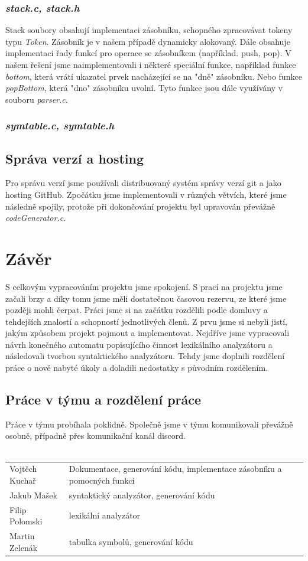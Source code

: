 \documentclass{article}
\begin{document}
\subsubsection{\emph{stack.c, stack.h}}
Stack soubory obsahují implementaci zásobníku, schopného zpracovávat tokeny typu \emph{Token}. Zásobník je v našem případě dynamicky alokovaný. Dále obsahuje implementaci řady funkcí pro operace se zásobníkem (například. push, pop). V našem řešení jsme naimplementovali i některé speciální funkce, například funkce \emph{bottom}, která vrátí ukazatel prvek nacházející se na "dně" zásobníku. Nebo funkce \emph{popBottom}, která "dno" zásobníku uvolní. Tyto funkce jsou dále využívány v souboru \emph{parser.c}.

\subsubsection{\emph{symtable.c, symtable.h}}


\subsection{Správa verzí a hosting}
Pro správu verzí jsme používali distribuovaný systém správy verzí git a jako hosting GitHub. Zpočátku jsme implementovali v různých větvích, které jsme následně spojily, protože při dokončování projektu byl upravován převážně \emph{codeGenerator.c}. 

\section{Závěr}
S celkovým vypracováním projektu jsme spokojení. S prací na projektu jsme začali brzy a díky tomu jsme měli dostatečnou časovou rezervu, ze které jsme později mohli čerpat. Práci jsme si na začátku rozdělili podle domluvy a tehdejších znalostí a schopností jednotlivých členů. Z prvu jsme si nebyli jistí, jakým způsobem projekt pojmout a implementovat. Nejdříve jsme vypracovali návrh konečného automatu popisujícího činnost lexikálního analyzátoru a následovali tvorbou syntaktického analyzátoru. Tehdy jsme doplnili rozdělení práce o nově nabyté úkoly a doladili nedostatky s původním rozdělením. \\

\subsection{Práce v týmu a rozdělení práce}
Práce v týmu probíhala poklidně. Společně jsme v týmu komunikovali převážně osobně, případně přes komunikační kanál discord.\\\\
\begin{tabular}{l l}
Vojtěch Kuchař & Dokumentace, generování kódu, implementace zásobníku a pomocných funkcí\\
Jakub Mašek & syntaktický analyzátor, generování kódu\\
Filip Polomski & lexikální analyzátor\\
Martin Zelenák & tabulka symbolů, generování kódu\\
\end{tabular}





\end{document}
